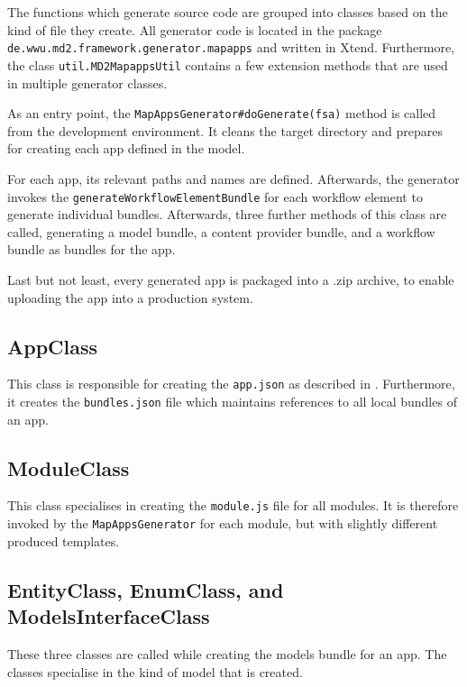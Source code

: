 
\label{sec:dev-generator-mapapps}

The functions which generate \mapapps source code are grouped into classes based on the kind of file they create. All \mapapps generator code is located in the package \lstinline[language=Simple]|de.wwu.md2.framework.generator.mapapps| and written in Xtend. Furthermore, the class \lstinline|util.MD2MapappsUtil| contains a few extension methods that are used in multiple generator classes.

As an entry point, the \lstinline[language=Simple]|MapAppsGenerator#doGenerate(fsa)| method is called from the development environment. It cleans the target directory and prepares for creating  each app defined in the model.

For each app, its relevant paths and names are defined. Afterwards, the generator invokes the \lstinline|generateWorkflowElementBundle| for each workflow element to generate individual bundles. Afterwards, three further methods of this class are called, generating a model bundle, a content provider bundle, and a workflow bundle as bundles for the app.


Last but not least, every generated app is packaged into a .zip archive, to enable uploading the app into a production \mapapps system.

\subsection{AppClass}

This class is responsible for creating the \lstinline[language=Simple]|app.json| as described in . Furthermore, it creates the \lstinline[language=Simple]|bundles.json| file which maintains references to all local bundles of an app.

\subsection{ModuleClass}

This class specialises in creating the \lstinline|module.js| file for all modules. It is therefore invoked by the \lstinline|MapAppsGenerator| for each module, but with slightly different produced templates.

\subsection{EntityClass, EnumClass, and ModelsInterfaceClass}
These three classes are called while creating the models bundle for an app. 
The classes specialise in the kind of model that is created.

